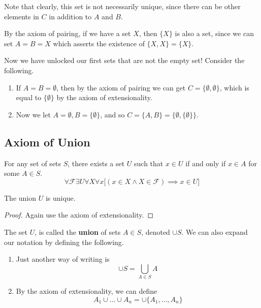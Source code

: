   Note that clearly, this set is not necessarily unique, since there can be other elements in $C$ in addition to $A$ and $B$. 

  \begin{theorem}
    By the axiom of pairing, if we have a set $X$, then $\{X\}$ is also a set, since we can set $A = B = X$ which asserts the existence of $\{X, X\} = \{X\}$. 
  \end{theorem} 

  \begin{example}
    Now we have unlocked our first sets that are not the empty set! Consider the following. 
    \begin{enumerate}
      \item If $A = B = \emptyset$, then by the axiom of pairing we can get $C = \{\emptyset, \emptyset\}$, which is equal to $\{\emptyset\}$ by the axiom of extensionality. 
      \item Now we let $A = \emptyset, B = \{\emptyset\}$, and so $C = \{A, B \} = \{\emptyset, \{\emptyset\}\}$. 
    \end{enumerate}
  \end{example}

\subsection{Axiom of Union}

  \begin{axiom} 
    For any set of sets $S$, there exists a set $U$ such that $x \in U$ if and only if $x \in A$ for some $A \in S$. 
    \begin{equation}
      \forall \mathcal{F} \exists U \forall X \forall x \big[ (x \in X \land X \in \mathcal{F}) \implies x \in U \big]
    \end{equation}
  \end{axiom}

  \begin{lemma}
    The union $U$ is unique. 
  \end{lemma}
  \begin{proof}
    Again use the axiom of extensionality. 
  \end{proof} 

  \begin{definition}[Union]
    The set $U$, is called the \textbf{union} of sets $A \in S$, denoted $\cup S$. We can also expand our notation by defining the following. 
    \begin{enumerate}
      \item Just another way of writing is 
        \begin{equation}
          \cup S = \bigcup_{A \in S} A
        \end{equation}

      \item By the axiom of extensionality, we can define 
        \begin{equation}
          A_1 \cup \ldots \cup A_n = \cup \{A_1, \ldots, A_n\}
        \end{equation}
    \end{enumerate}
  \end{definition}

